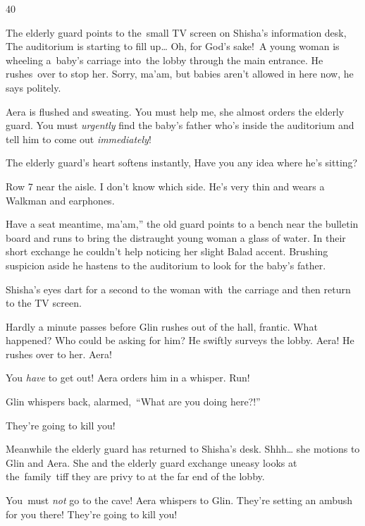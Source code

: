 \documentclass[twoside,11pt]{book}
\begin{document}
\bigskip

40\ \ 

The elderly guard points to the~small TV screen on Shisha's information desk, {\textquotedbl}The auditorium is starting
to fill up{\dots} Oh, for God's sake!{\textquotedbl}\ A young woman is wheeling a~baby's carriage into~the lobby
through the main entrance. He rushes{\ }over to stop her. {\textquotedbl}Sorry,
ma'am, but babies aren't allowed in here now,{\textquotedbl} he says politely.

Aera is flushed and sweating. {\textquotedbl}You must help me,{\textquotedbl} she almost orders the elderly guard.
{\textquotedbl}You must \textit{urgently} find the baby's father who's inside the auditorium and tell him to come out
\textit{immediately}!{\textquotedbl} 

The elderly guard's heart softens instantly, {\textquotedbl}Have you any idea where he's sitting?{\textquotedbl}

{\textquotedbl}Row 7 near the aisle. I don't know which side. He's very thin and wears a Walkman and
earphones.{\textquotedbl} 

{\textquotedbl}Have a seat meantime, ma'am,'' the old guard points to a bench near the bulletin board and runs to bring
the distraught young woman a glass of water. In their short exchange he couldn't help noticing her slight Balad accent.
Brushing suspicion aside he hastens to the auditorium to look for the baby's father.

Shisha's eyes dart for a second to the woman with{\ }the carriage and then
return to the TV screen.

Hardly a minute passes before Glin rushes out of the hall, frantic. What happened? Who could be asking for him? He
swiftly surveys the lobby. Aera! He rushes over to her. {\textquotedbl}Aera!{\textquotedbl} 

{\textquotedbl}You \textit{have} to get out!{\textquotedbl} Aera orders him in a whisper.
{\textquotedbl}Run!{\textquotedbl} 

Glin whispers back, alarmed{,\ }{}``What are you doing here?!'' 

{\textquotedbl}They're going to kill you!{\textquotedbl}

Meanwhile the elderly guard has returned to Shisha's desk. {\textquotedbl}Shhh{\dots}{\textquotedbl} she motions to Glin
and Aera. She and the elderly guard exchange{ u}neasy looks at the~family~tiff
they are privy to at the far end of the lobby.\textbf{\ }

{\textquotedbl}You\textit{\ }must\textit{ not} go to the cave!{\textquotedbl} Aera whispers to Glin.
{\textquotedbl}They're setting an ambush for you there! They're going to kill you!{\textquotedbl} 
\end{document}
